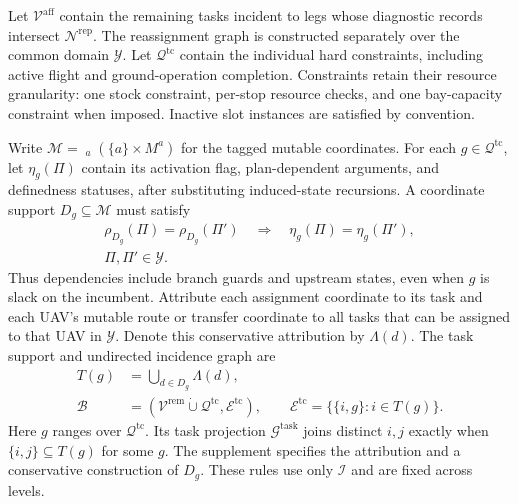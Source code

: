 Let $\mathcal V^{\mathrm{aff}}$ contain the remaining tasks incident to
legs whose diagnostic records intersect $\mathcal N^{\mathrm{rep}}$.
The reassignment graph is constructed separately over the common domain
$\mathcal Y$. Let $\mathcal Q^{\mathrm{tc}}$ contain the individual hard
constraints, including active flight and ground-operation completion.
Constraints retain their resource granularity: one stock constraint,
per-stop resource checks, and one bay-capacity constraint when imposed.
Inactive slot instances are satisfied by convention.

\balance
Write $\mathcal M=\mathop{\dot\bigcup}_{a}(\{a\}\times M^a)$ for the
tagged mutable coordinates. For each $g\in\mathcal Q^{\mathrm{tc}}$,
let $\eta_g(\Pi)$ contain its activation flag, plan-dependent arguments,
and definedness statuses, after substituting induced-state recursions.
A coordinate support $D_g\subseteq\mathcal M$ must satisfy
\begin{equation}
\begin{split}
\rho_{D_g}(\Pi)=\rho_{D_g}(\Pi')
\quad\Longrightarrow\quad\eta_g(\Pi)=\eta_g(\Pi'),\\
\Pi,\Pi'\in\mathcal Y.
\end{split}
\label{eq:constraint_coordinate_support}
\end{equation}
Thus dependencies include branch guards and upstream states, even when
$g$ is slack on the incumbent. Attribute each assignment coordinate to
its task and each UAV's mutable route or transfer coordinate to all tasks
that can be assigned to that UAV in $\mathcal Y$. Denote this conservative
attribution by $\Lambda(d)$. The task support and undirected incidence
graph are
\begin{align}
T(g)&=\bigcup_{d\in D_g}\Lambda(d),
\label{eq:constraint_task_support}\\
\mathcal B&=(\mathcal V^{\mathrm{rem}}\mathbin{\dot\cup}
\mathcal Q^{\mathrm{tc}},\mathcal E^{\mathrm{tc}}),\qquad
\mathcal E^{\mathrm{tc}}=\{\{i,g\}:i\in T(g)\}.
\label{eq:incidence_graph}
\end{align}
Here $g$ ranges over $\mathcal Q^{\mathrm{tc}}$.
Its task projection $\mathcal G^{\mathrm{task}}$ joins distinct $i,j$
exactly when $\{i,j\}\subseteq T(g)$ for some $g$.
The supplement specifies the attribution and a conservative construction
of $D_g$. These rules use only $\mathscr I$ and are fixed across levels.

